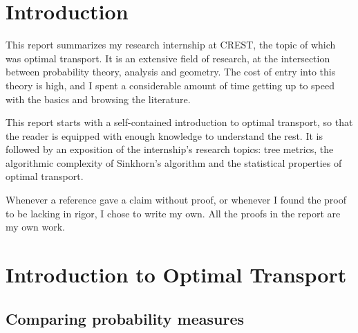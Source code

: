 \documentclass[12pt]{report}
\theoremstyle{definition}
\theoremstyle{remark}
\begin{document}
\restoregeometry
\newpage

\tableofcontents
\newpage

\onehalfspacing

\chapter*{Introduction}

\hspace{\parindent}This report summarizes my research internship at CREST, the topic of which was optimal transport. It is an extensive field of research, at the intersection between probability theory, analysis and geometry. The cost of entry into this theory is high, and I spent a considerable amount of time getting up to speed with the basics and browsing the literature.\\
\par This report starts with a self-contained introduction to optimal transport, so that the reader is equipped with enough knowledge to understand the rest. It is followed by an exposition of the internship's research topics: tree metrics, the algorithmic complexity of Sinkhorn's algorithm and the statistical properties of optimal transport.\\
\par Whenever a reference gave a claim without proof, or whenever I found the proof to be lacking in rigor, I chose to write my own. All the proofs in the report are my own work.



\onehalfspacing
\chapter{Introduction to Optimal Transport}

\section{Comparing probability measures}
\end{document}

